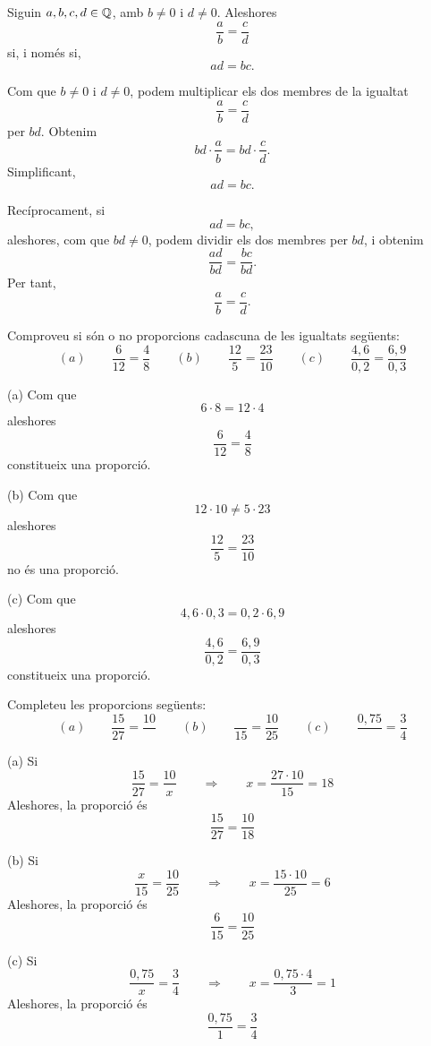 \begin{proposicio}
Siguin \(a,b,c,d\in\mathbb{Q}\), amb \(b\neq0\) i \(d\neq0\). Aleshores
\[
	\frac{a}{b}=\frac{c}{d}
\]
si, i només si,
\[
	ad=bc.
\]
\end{proposicio}

\begin{prova}
Com que \(b\neq0\) i \(d\neq0\), podem multiplicar els dos membres de la igualtat
\[
	\frac{a}{b}=\frac{c}{d}
\]
per \(bd\). Obtenim
\[
	bd\cdot\frac{a}{b}=bd\cdot\frac{c}{d}.
\]
Simplificant,
\[
	ad=bc.
\]

Recíprocament, si
\[
	ad=bc,
\]
aleshores, com que \(bd\neq0\), podem dividir els dos membres per \(bd\), i obtenim
\[
	\frac{ad}{bd}=\frac{bc}{bd}.
\]
Per tant,
\[
	\frac{a}{b}=\frac{c}{d}.
\]
\end{prova}

\begin{exemple}
Comproveu si són o no proporcions cadascuna de les igualtats següents:%
\[
(a)\qquad\frac{6}{12}=\frac{4}{8}\qquad(b)\qquad\frac{12}{5}=\frac{23}%
{10}\qquad(c)\qquad\frac{4{,}6}{0{,}2}=\frac{6{,}9}{0{,}3}%
\]

\end{exemple}

\begin{solucio}
(a) Com que%
\[
6\cdot8=12\cdot4
\]
aleshores%
\[
\frac{6}{12}=\frac{4}{8}%
\]
constitueix una proporció.

(b) Com que
\[
12\cdot10\neq5\cdot23
\]
aleshores%
\[
\frac{12}{5}=\frac{23}{10}%
\]
no és una proporció.

(c) Com que%
\[
4{,}6\cdot0{,}3=0{,}2\cdot6{,}9
\]
aleshores%
\[
\frac{4{,}6}{0{,}2}=\frac{6{,}9}{0{,}3}%
\]
constitueix una proporció.
\end{solucio}

\begin{exemple}
Completeu les proporcions següents:%
\[
(a)\qquad\frac{15}{27}=\frac{10}{{}}\qquad(b)\qquad\frac{{}}{15}=\frac{10}%
{25}\qquad(c)\qquad\frac{0{,}75}{{}}=\frac{3}{4}%
\]

\end{exemple}

\begin{solucio}
(a) Si%
\[
\frac{15}{27}=\frac{10}{x}\qquad\Longrightarrow\qquad x=\frac{27\cdot10}%
{15}=18
\]
Aleshores, la proporció és%
\[
\frac{15}{27}=\frac{10}{18}%
\]


(b) Si%
\[
\frac{x}{15}=\frac{10}{25}\qquad\Longrightarrow\qquad x=\frac{15\cdot10}{25}=6
\]
Aleshores, la proporció és%
\[
\frac{6}{15}=\frac{10}{25}%
\]


(c) Si%
\[
\frac{0{,}75}{x}=\frac{3}{4}\qquad\Longrightarrow\qquad x=\frac{0{,}75\cdot4}{3}=1
\]
Aleshores, la proporció és%
\[
\frac{0{,}75}{1}=\frac{3}{4}%
\]

\end{solucio}

